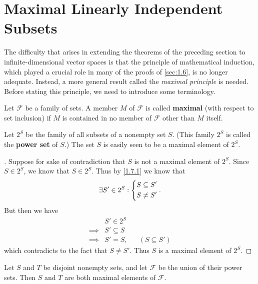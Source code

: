 \section{Maximal Linearly Independent Subsets}\label{sec:1.7}

\begin{note}
	The difficulty that arises in extending the theorems of the preceding section to infinite-dimensional vector spaces is that the principle of mathematical induction, which played a crucial role in many of the proofs of \cref{sec:1.6}, is no longer adequate.
	Instead, a more general result called the \emph{maximal principle} is needed.
	Before stating this principle, we need to introduce some terminology.
\end{note}

\begin{defn}\label{1.7.1}
	Let \(\mathcal{F}\) be a family of sets.
	A member \(M\) of \(\mathcal{F}\) is called \textbf{maximal} (with respect to set inclusion) if \(M\) is contained in no member of \(\mathcal{F}\) other than \(M\) itself.
\end{defn}

\begin{eg}\label{1.7.2}
	Let \(2^S\) be the family of all subsets of a nonempty set \(S\).
	(This family \(2^S\) is called the \textbf{power set} of \(S\).)
	The set \(S\) is easily seen to be a maximal element of \(2^S\).
\end{eg}

\begin{proof}[]
	Suppose for sake of contradiction that \(S\) is not a maximal element of \(2^S\).
	Since \(S \in 2^S\), we know that \(S \in 2^S\).
	Thus by \cref{1.7.1} we know that
	\[
		\exists S' \in 2^S : \begin{dcases}
			S \subseteq S' \\
			S \neq S'
		\end{dcases}.
	\]
	But then we have
	\begin{align*}
		         & S' \in 2^S                           \\
		\implies & S' \subseteq S                       \\
		\implies & S' = S,        &  & (S \subseteq S')
	\end{align*}
	which contradicts to the fact that \(S \neq S'\).
	Thus \(S\) is a maximal element of \(2^S\).
\end{proof}

\begin{eg}\label{1.7.3}
	Let \(S\) and \(T\) be disjoint nonempty sets, and let \(\mathcal{F}\) be the union of their power sets.
	Then \(S\) and \(T\) are both maximal elements of \(\mathcal{F}\).
\end{eg}

